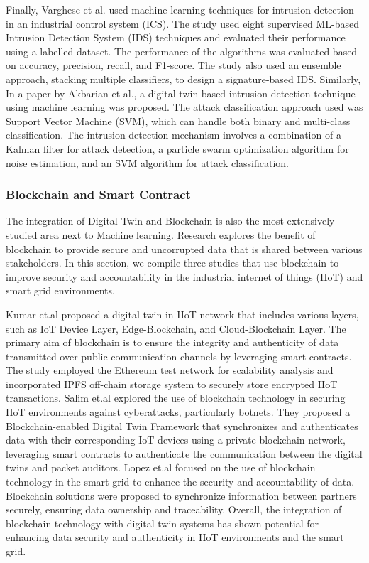 Finally, Varghese et al.\cite{vargheseDigitalTwinbasedIntrusion2022} used machine learning techniques for intrusion detection in an industrial control system (ICS). The study used eight supervised ML-based Intrusion Detection System (IDS) techniques and evaluated their performance using a labelled dataset. The performance of the algorithms was evaluated based on accuracy, precision, recall, and F1-score. The study also used an ensemble approach, stacking multiple classifiers, to design a signature-based IDS. Similarly, In a paper by Akbarian et al.\cite{akbarianIntrusionDetectionDigital2020}, a digital twin-based intrusion detection technique using machine learning was proposed. The attack classification approach used was Support Vector Machine (SVM), which can handle both binary and multi-class classification. The intrusion detection mechanism involves a combination of a Kalman filter for attack detection, a particle swarm optimization algorithm for noise estimation, and an SVM algorithm for attack classification.


 

\subsubsection{Blockchain and Smart Contract}
The integration of Digital Twin and Blockchain is also the most extensively studied area next to Machine learning. Research explores the benefit of blockchain to provide secure and uncorrupted data that is shared between various stakeholders. In this section, we compile three studies that use blockchain to improve security and accountability in the industrial internet of things (IIoT) and smart grid environments.  


 Kumar et.al\cite{kumarBlockchainDeepLearning2022} proposed a digital twin in IIoT network that includes various layers, such as IoT Device Layer, Edge-Blockchain, and Cloud-Blockchain Layer. The primary aim of blockchain is to ensure the integrity and authenticity of data transmitted over public communication channels by leveraging smart contracts. The study employed the Ethereum test network for scalability analysis and incorporated IPFS off-chain storage system to securely store encrypted IIoT transactions. Salim et.al\cite{salimBlockchainEnabledSecureDigital2022} explored the use of blockchain technology in securing IIoT environments against cyberattacks, particularly botnets. They proposed a Blockchain-enabled Digital Twin Framework that synchronizes and authenticates data with their corresponding IoT devices using a private blockchain network, leveraging smart contracts to authenticate the communication between the digital twins and packet auditors. Lopez et.al\cite{lopezDIGITALTWINSINTELLIGENT2021} focused on the use of blockchain technology in the smart grid to enhance the security and accountability of data. Blockchain solutions were proposed to synchronize information between partners securely, ensuring data ownership and traceability. Overall, the integration of blockchain technology with digital twin systems has shown potential for enhancing data security and authenticity in IIoT environments and the smart grid.

